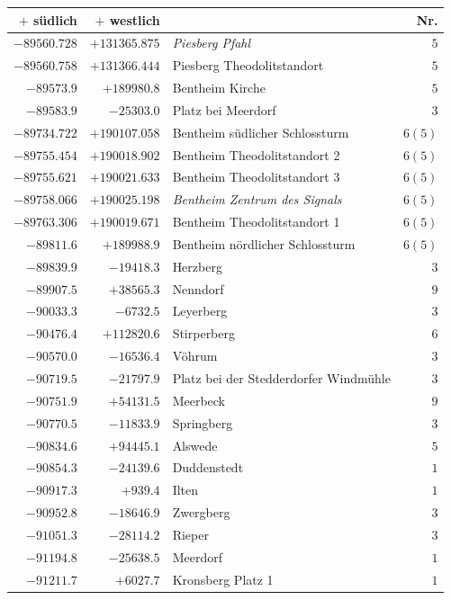 \clearpage{}%
\begin{center}\begingroup\fontsize{8}{9}\selectfont
\setlength{\tabcolsep}{4pt}
\begin{tabular}{r|r|p{170pt}|r}\hline
\(+\) südlich&\(+\) westlich&&Nr.\\\hline
\(-89560.728\)&\(+131365.875\)&\textit{Piesberg Pfahl}&\(5\)\\
\(-89560.758\)&\(+131366.444\)&Piesberg Theodolitstandort&\(5\)\\
\(-89573.9\)&\(+189980.8\)&Bentheim Kirche&\(5\)\\
\(-89583.9\)&\(-25303.0\)&Platz bei Meerdorf&\(3\)\\
\(-89734.722\)&\(+190107.058\)&Bentheim südlicher Schlossturm&\(6 (5)\)\\
\(-89755.454\)&\(+190018.902\)&Bentheim Theodolitstandort 2&\(6 (5)\)\\
\(-89755.621\)&\(+190021.633\)&Bentheim Theodolitstandort 3&\(6 (5)\)\\
\(-89758.066\)&\(+190025.198\)&\textit{Bentheim Zentrum des Signals}&\(6 (5)\)\\
\(-89763.306\)&\(+190019.671\)&Bentheim Theodolitstandort 1&\(6 (5)\)\\
\(-89811.6\)&\(+189988.9\)&Bentheim nördlicher Schlossturm&\(6 (5)\)\\
\(-89839.9\)&\(-19418.3\)&Herzberg&\(3\)\\
\(-89907.5\)&\(+38565.3\)&Nenndorf&\(9\)\\
\(-90033.3\)&\(-6732.5\)&Leyerberg&\(3\)\\
\(-90476.4\)&\(+112820.6\)&Stirperberg&\(6\)\\
\(-90570.0\)&\(-16536.4\)&Vöhrum&\(3\)\\
\(-90719.5\)&\(-21797.9\)&Platz bei der Stedderdorfer Windmühle&\(3\)\\
\(-90751.9\)&\(+54131.5\)&Meerbeck&\(9\)\\
\(-90770.5\)&\(-11833.9\)&Springberg&\(3\)\\
\(-90834.6\)&\(+94445.1\)&Alswede&\(5\)\\
\(-90854.3\)&\(-24139.6\)&Duddenstedt&\(1\)\\
\(-90917.3\)&\(+939.4\)&Ilten&\(1\)\\
\(-90952.8\)&\(-18646.9\)&Zwergberg&\(3\)\\
\(-91051.3\)&\(-28114.2\)&Rieper&\(3\)\\
\(-91194.8\)&\(-25638.5\)&Meerdorf&\(1\)\\
\(-91211.7\)&\(+6027.7\)&Kronsberg Platz 1&\(1\)\\

\end{tabular}
\end{center}
